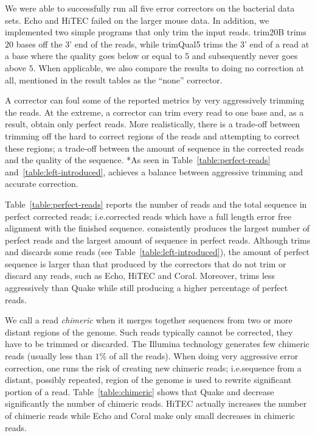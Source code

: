 \documentclass[10pt]{bmc_article}
\newenvironment{bmcformat}{\fussy\setboolean{publ}{true}}{\fussy}
\begin{document}
\begin{bmcformat}
We were able to successfully run all five error correctors on the bacterial data sets.  
Echo and HiTEC failed on the larger mouse data.
In addition, we implemented two simple programs that only trim the input reads.
trim20B trims $20$ bases off the 3' end of the reads, while trimQual5 trims the 3' end of a read at a base where the quality goes below or equal to $5$ and subsequently never goes above $5$.
When applicable, we also compare the results to doing no correction at all, mentioned in the result tables as the ``none'' corrector.

A corrector can foul some of the reported metrics by very aggressively trimming the reads.
At the extreme, a corrector can trim every read to one base and, as a result, obtain only perfect reads.
More realistically, there is a trade-off between trimming off the hard to correct regions of the reads and attempting to correct these regions; a trade-off between the amount of sequence in the corrected reads and the quality of the sequence.
*As seen in Table~\ref{table:perfect-reads} and~\ref{table:left-introduced}, \quorum achieves a balance between aggressive trimming and accurate correction.

Table~\ref{table:perfect-reads} reports the number of reads and the total sequence in perfect corrected reads;
i.e.\@ corrected reads which have a full length error free alignment with the finished sequence.
\quorum consistently produces the largest number of perfect reads and the largest amount of sequence in perfect reads.
Although \quorum trims and discards some reads (see Table~\ref{table:left-introduced}), the amount of perfect sequence is larger than that produced by the correctors that do not trim or discard any reads, such as Echo, HiTEC and Coral.
Moreover, \quorum trims less aggressively than Quake while still producing a higher percentage of perfect reads.

We call a read \emph{chimeric} when it merges together sequences from two or more distant regions of the genome.
Such reads typically cannot be corrected, they have to be trimmed or discarded.
The Illumina technology generates few chimeric reads (usually less than $1\%$ of all the reads).
When doing very aggressive error correction, one runs the risk of creating new chimeric reads;
i.e.\@ sequence from a distant, possibly repeated, region of the genome is used to rewrite significant portion of a read.
Table~\ref{table:chimeric} shows that Quake and \quorum decrease significantly the number of chimeric reads.
HiTEC actually  increases the number of chimeric reads while Echo and Coral make only small decreases in chimeric reads.


\end{bmcformat}
\end{document}
